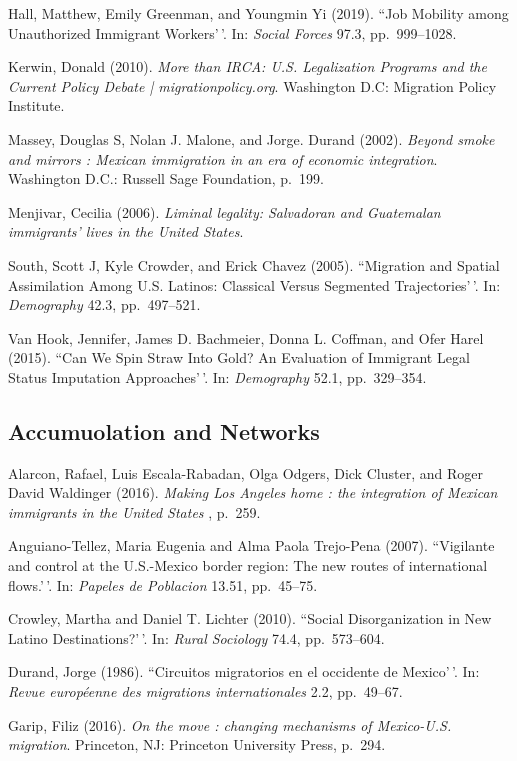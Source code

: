 \documentclass[11pt,]{article}
\begin{document}
Hall, Matthew, Emily Greenman, and Youngmin Yi (2019). ``Job Mobility
among Unauthorized Immigrant Workers'\,'. In: \emph{Social Forces} 97.3,
pp.~999--1028.

Kerwin, Donald (2010).
\emph{More than IRCA: U.S. Legalization Programs and the Current Policy Debate | migrationpolicy.org}.
Washington D.C: Migration Policy Institute.

Massey, Douglas S, Nolan J. Malone, and Jorge. Durand (2002).
\emph{Beyond smoke and mirrors : Mexican immigration in an era of economic integration}.
Washington D.C.: Russell Sage Foundation, p.~199.

Menjivar, Cecilia (2006).
\emph{Liminal legality: Salvadoran and Guatemalan immigrants' lives in the United States}.

South, Scott J, Kyle Crowder, and Erick Chavez (2005). ``Migration and
Spatial Assimilation Among U.S. Latinos: Classical Versus Segmented
Trajectories'\,'. In: \emph{Demography} 42.3, pp.~497--521.

Van Hook, Jennifer, James D. Bachmeier, Donna L. Coffman, and Ofer Harel
(2015). ``Can We Spin Straw Into Gold? An Evaluation of Immigrant Legal
Status Imputation Approaches'\,'. In: \emph{Demography} 52.1,
pp.~329--354.

\hypertarget{accumuolation-and-networks}{%
\subsection{Accumuolation and
Networks}\label{accumuolation-and-networks}}

Alarcon, Rafael, Luis Escala-Rabadan, Olga Odgers, Dick Cluster, and
Roger David Waldinger (2016).
\emph{Making Los Angeles home : the integration of Mexican immigrants in the United States}
, p.~259.

Anguiano-Tellez, Maria Eugenia and Alma Paola Trejo-Pena (2007).
``Vigilante and control at the U.S.-Mexico border region: The new routes
of international flows.'\,'. In: \emph{Papeles de Poblacion} 13.51,
pp.~45--75.

Crowley, Martha and Daniel T. Lichter (2010). ``Social Disorganization
in New Latino Destinations?'\,'. In: \emph{Rural Sociology} 74.4,
pp.~573--604.

Durand, Jorge (1986). ``Circuitos migratorios en el occidente de
Mexico'\,'. In: \emph{Revue européenne des migrations internationales}
2.2, pp.~49--67.

Garip, Filiz (2016).
\emph{On the move : changing mechanisms of Mexico-U.S. migration}.
Princeton, NJ: Princeton University Press, p.~294.
\end{document}
